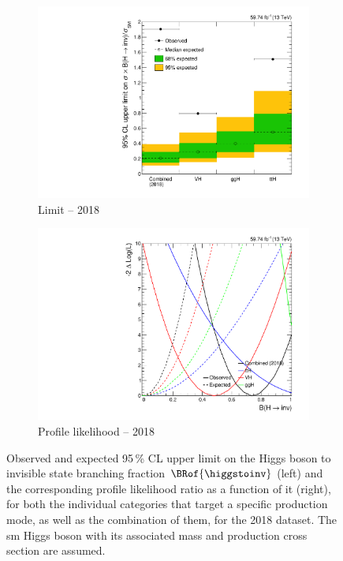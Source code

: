 \begin{figure}[htbp]
    \centering
    \begin{subfigure}[t]{0.45\textwidth}
        \includegraphics[width=\textwidth]{figures/limits/per_year/limit_2018_comb.pdf}
        \caption{Limit -- 2018}
    \end{subfigure}
    \hspace{0.05\textwidth}
    \begin{subfigure}[t]{0.45\textwidth}
        \includegraphics[width=\textwidth]{figures/likelihood_scan/profile_likelihood_scan_2018.pdf}
        \caption{Profile likelihood -- 2018}
    \end{subfigure}
    \caption[Observed and expected 95\,\% CL upper limit on the Higgs boson to invisible state branching fraction $\BRof{\higgstoinv}$ and the corresponding profile likelihood ratio as a function of it, for both the individual categories that target a specific production mode, as well as the combination of them, for the 2018 dataset]{Observed and expected 95\,\% CL upper limit on the Higgs boson to invisible state branching fraction $\BRof{\higgstoinv}$ (left) and the corresponding profile likelihood ratio as a function of it (right), for both the individual categories that target a specific production mode, as well as the combination of them, for the 2018 dataset. The \acrlong{sm} Higgs boson with its associated mass and production cross section are assumed.}
    \label{fig:htoinv_limit_likelihood_2018}
\end{figure}

